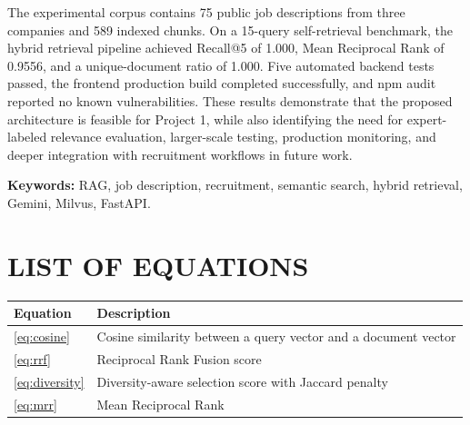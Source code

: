 \documentclass[12pt,a4paper,oneside]{report}
\newcommand{\keyword}[1]{\textbf{Keywords:} #1}
\begin{document}
The experimental corpus contains 75 public job descriptions from three companies and 589 indexed chunks. On a 15-query self-retrieval benchmark, the hybrid retrieval pipeline achieved Recall@5 of 1.000, Mean Reciprocal Rank of 0.9556, and a unique-document ratio of 1.000. Five automated backend tests passed, the frontend production build completed successfully, and npm audit reported no known vulnerabilities. These results demonstrate that the proposed architecture is feasible for Project 1, while also identifying the need for expert-labeled relevance evaluation, larger-scale testing, production monitoring, and deeper integration with recruitment workflows in future work.

\keyword{RAG, job description, recruitment, semantic search, hybrid retrieval, Gemini, Milvus, FastAPI.}

\tableofcontents
\listoffigures
\listoftables

\chapter*{LIST OF EQUATIONS}
\begin{longtable}{p{3cm}p{11cm}}
\toprule
\textbf{Equation} & \textbf{Description}\\
\midrule
\ref{eq:cosine} & Cosine similarity between a query vector and a document vector\\
\ref{eq:rrf} & Reciprocal Rank Fusion score\\
\ref{eq:diversity} & Diversity-aware selection score with Jaccard penalty\\
\ref{eq:mrr} & Mean Reciprocal Rank\\
\bottomrule
\end{longtable}
\end{document}
